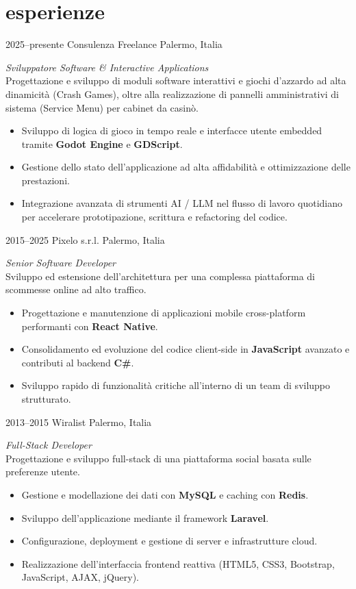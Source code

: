 \documentclass[]{friggeri-cv} %
\begin{document}
\section{esperienze}
\begin{entrylist}

\entry
{2025--presente}
{Consulenza Freelance}
{Palermo, Italia}
{\emph{Sviluppatore Software \& Interactive Applications} \\
Progettazione e sviluppo di moduli software interattivi e giochi d'azzardo ad alta dinamicità (Crash Games), oltre alla realizzazione di pannelli amministrativi di sistema (Service Menu) per cabinet da casinò.
\begin{itemize}
\item Sviluppo di logica di gioco in tempo reale e interfacce utente embedded tramite \textbf{Godot Engine} e \textbf{GDScript}.
\item Gestione dello stato dell'applicazione ad alta affidabilità e ottimizzazione delle prestazioni.
\item Integrazione avanzata di strumenti AI / LLM nel flusso di lavoro quotidiano per accelerare prototipazione, scrittura e refactoring del codice.
\end{itemize}
}

\entry
{2015--2025}
{Pixelo s.r.l.}
{Palermo, Italia}
{\emph{Senior Software Developer} \\
Sviluppo ed estensione dell'architettura per una complessa piattaforma di scommesse online ad alto traffico.
\begin{itemize}
\item Progettazione e manutenzione di applicazioni mobile cross-platform performanti con \textbf{React Native}.
\item Consolidamento ed evoluzione del codice client-side in \textbf{JavaScript} avanzato e contributi al backend \textbf{C\#}.
\item Sviluppo rapido di funzionalità critiche all'interno di un team di sviluppo strutturato.
\end{itemize}
}

\entry
{2013--2015}
{Wiralist}
{Palermo, Italia}
{\emph{Full-Stack Developer} \\
Progettazione e sviluppo full-stack di una piattaforma social basata sulle preferenze utente.
\begin{itemize}
\item Gestione e modellazione dei dati con \textbf{MySQL} e caching con \textbf{Redis}.
\item Sviluppo dell'applicazione mediante il framework \textbf{Laravel}.
\item Configurazione, deployment e gestione di server e infrastrutture cloud.
\item Realizzazione dell'interfaccia frontend reattiva (HTML5, CSS3, Bootstrap, JavaScript, AJAX, jQuery).
\end{itemize}
}


\end{entrylist}
\end{document}
